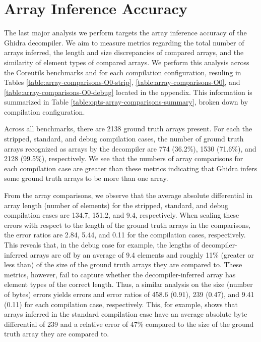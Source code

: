 \section{Array Inference Accuracy}

The last major analysis we perform targets the array inference accuracy of the Ghidra decompiler. We aim to measure metrics regarding the total number of arrays inferred, the length and size discrepancies of compared arrays, and the similarity of element types of compared arrays. We perform this analysis across the Coreutils benchmarks and for each compilation configuration, resuling in Tables \ref{table:array-comparisons-O0-strip}, \ref{table:array-comparisons-O0}, and \ref{table:array-comparisons-O0-debug} located in the appendix. This information is summarized in Table \ref{table:opts-array-comparisons-summary}, broken down by compilation configuration.



Across all benchmarks, there are 2138 ground truth arrays present. For each the stripped, standard, and debug compilation cases, the number of ground truth arrays recognized as arrays by the decompiler are 774 (36.2\%), 1530 (71.6\%), and 2128 (99.5\%), respectively. We see that the numbers of array comparisons for each compilation case are greater than these metrics indicating that Ghidra infers some ground truth arrays to be more than one array.

From the array comparisons, we observe that the average absolute differential in array length (number of elements) for the stripped, standard, and debug compilation cases are 134.7, 151.2, and 9.4, respectively. When scaling these errors with respect to the length of the ground truth arrays in the comparisons, the error ratios are 2.84, 5.44, and 0.11 for the compilation cases, respectively. This reveals that, in the debug case for example, the lengths of decompiler-inferred arrays are off by an average of 9.4 elements and roughly 11\% (greater or less than) of the size of the ground truth arrays they are compared to. These metrics, however, fail to capture whether the decompiler-inferred array has element types of the correct length. Thus, a similar analysis on the size (number of bytes) errors yields errors and error ratios of 458.6 (0.91), 239 (0.47), and 9.41 (0.11) for each compilation case, respectively. This, for example, shows that arrays inferred in the standard compilation case have an average absolute byte differential of 239 and a relative error of 47\% compared to the size of the ground truth array they are compared to.

